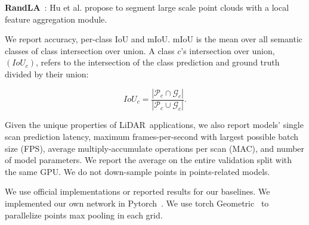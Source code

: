 \documentclass[10pt,twocolumn,letterpaper]{article}
\newcommand{\lidar}{\mbox{LiDAR }}
\begin{document}
\textbf{RandLA}~\cite{hu2019randla}: Hu et al. propose to segment large scale point clouds with a local feature aggregation module.

We report accuracy, per-class IoU and mIoU. mIoU is the mean over all semantic classes of class intersection over union. A class $c$'s intersection over union, $(IoU_c)$, refers to the intersection of the class prediction and ground truth divided by their union:

\begin{equation}
    IoU_{c} = \frac{|\mathcal{P}_{c}\cap \mathcal{G}_{c}|}{|\mathcal{P}_{c}\cup \mathcal{G}_{c}|}.
\end{equation}

Given the unique properties of \lidar applications, we also report models' single scan prediction latency, maximum frames-per-second with largest possible batch size (FPS), average multiply-accumulate operations per scan (MAC), and number of model parameters. We report the average on the entire validation split with the same GPU. We do not down-sample points in points-related models.

We use official implementations or reported results for our baselines. We implemented our own network in Pytorch~\cite{paszke2017automatic}. We use torch Geometric~\cite{Fey/Lenssen/2019} to parallelize points max pooling in each grid.
\end{document}
